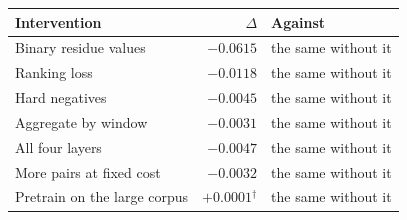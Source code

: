 \begin{tabular}{lrl}
\toprule
    \textbf{Intervention} & \textbf{$\Delta$} & \textbf{Against} \\
\midrule
    Binary residue values & $-0.0615$ & the same without it \\
    Ranking loss & $-0.0118$ & the same without it \\
    Hard negatives & $-0.0045$ & the same without it \\
    Aggregate by window & $-0.0031$ & the same without it \\
    All four layers & $-0.0047$ & the same without it \\
    More pairs at fixed cost & $-0.0032$ & the same without it \\
    Pretrain on the large corpus & $+0.0001$$^{\dagger}$ & the same without it \\
\bottomrule
\end{tabular}
